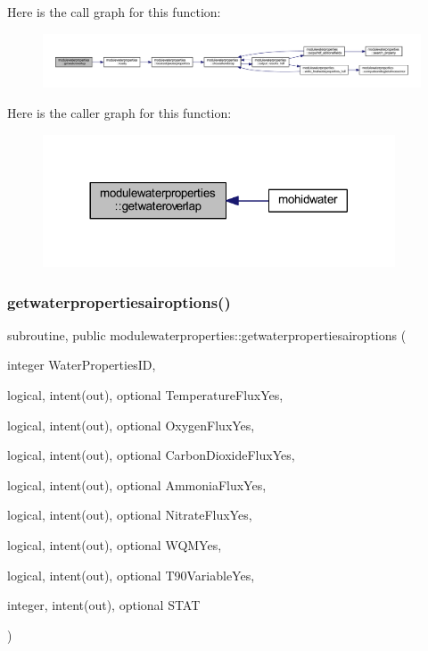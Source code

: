 Here is the call graph for this function\+:\nopagebreak
\begin{figure}[H]
\begin{center}
\leavevmode
\includegraphics[width=350pt]{namespacemodulewaterproperties_a923a45b4d978be815b69f1ca9bb63891_cgraph}
\end{center}
\end{figure}
Here is the caller graph for this function\+:\nopagebreak
\begin{figure}[H]
\begin{center}
\leavevmode
\includegraphics[width=296pt]{namespacemodulewaterproperties_a923a45b4d978be815b69f1ca9bb63891_icgraph}
\end{center}
\end{figure}
\mbox{\label{namespacemodulewaterproperties_a01766661cdbaa08fdb84926b54369de4}} 
\subsubsection{\texorpdfstring{getwaterpropertiesairoptions()}{getwaterpropertiesairoptions()}}
{\footnotesize\ttfamily subroutine, public modulewaterproperties\+::getwaterpropertiesairoptions (\begin{DoxyParamCaption}\item[{integer}]{Water\+Properties\+ID,  }\item[{logical, intent(out), optional}]{Temperature\+Flux\+Yes,  }\item[{logical, intent(out), optional}]{Oxygen\+Flux\+Yes,  }\item[{logical, intent(out), optional}]{Carbon\+Dioxide\+Flux\+Yes,  }\item[{logical, intent(out), optional}]{Ammonia\+Flux\+Yes,  }\item[{logical, intent(out), optional}]{Nitrate\+Flux\+Yes,  }\item[{logical, intent(out), optional}]{W\+Q\+M\+Yes,  }\item[{logical, intent(out), optional}]{T90\+Variable\+Yes,  }\item[{integer, intent(out), optional}]{S\+T\+AT }\end{DoxyParamCaption})}

